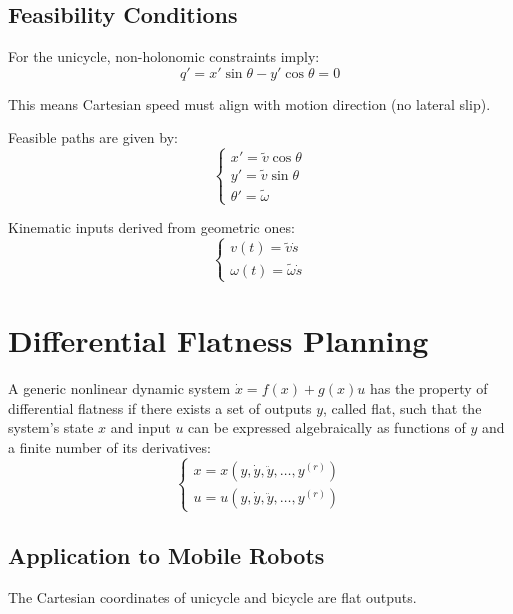 \documentclass[openany]{book}
\theoremstyle{definition}
\theoremstyle{remark}
\newcommand{\definitionbox}[1]{
\begin{tcolorbox}[colback=blue!5,colframe=blue!40!black,title=Definition]
 #1
\end{tcolorbox}
}
\begin{document}
\subsection{Feasibility Conditions}
For the unicycle, non-holonomic constraints imply:
\begin{equation}
    [sin \theta \; -\cos \theta \; 0]q' = x'\sin \theta - y'\cos \theta = 0
\end{equation}

This means Cartesian speed must align with motion direction (no lateral slip).

Feasible paths are given by:
\begin{equation}
    \begin{cases}
        x' = \tilde{v}\cos \theta \\
        y' = \tilde{v}\sin \theta \\
        \theta' = \tilde{\omega}
    \end{cases}
\end{equation}

Kinematic inputs derived from geometric ones:
\begin{equation}
    \begin{cases}
        v(t) = \tilde{v}\dot{s} \\
        \omega(t) = \tilde{\omega}\dot{s}
    \end{cases}
\end{equation}

\section{Differential Flatness Planning}

\definitionbox{A generic nonlinear dynamic system $\dot{x} = f(x) + g(x)u$ has the property of differential flatness if there exists a set of outputs $y$, called flat, such that the system's state $x$ and input $u$ can be expressed algebraically as functions of $y$ and a finite number of its derivatives:
\begin{equation}
    \begin{cases}
        x = x(y, \dot{y}, \ddot{y}, \ldots, y^{(r)}) \\
        u = u(y, \dot{y}, \ddot{y}, \ldots, y^{(r)})
    \end{cases}
\end{equation}}

\subsection{Application to Mobile Robots}
The Cartesian coordinates of unicycle and bicycle are flat outputs.
\end{document}

